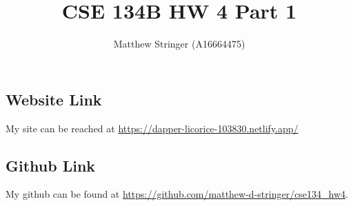 \documentclass{article}
\title{CSE 134B HW 4 Part 1}
\author{
  Matthew Stringer (A16664475)
}
\theoremstyle{definition}
\begin{document}
    \maketitle
    \subsection*{Website Link}
    My site can be reached at \url{https://dapper-licorice-103830.netlify.app/}
    \subsection*{Github Link}
    My github can be found at \url{https://github.com/matthew-d-stringer/cse134_hw4}.
\end{document}
